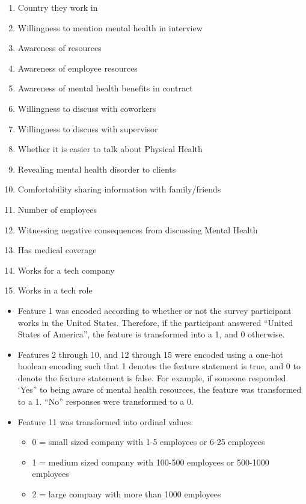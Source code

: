 \documentclass[times, twocolumn]{article}
\begin{document}
\begin{enumerate}
    \item Country they work in
    \item Willingness to mention mental health in interview
    \item Awareness of resources
    \item Awareness of employee resources
    \item Awareness of mental health benefits in contract
    \item Willingness to discuss with coworkers
    \item Willingness to discuss with supervisor
    \item Whether it is easier to talk about Physical Health
    \item Revealing mental health disorder to clients
    \item Comfortability sharing information with family/friends
    \item Number of employees
    \item Witnessing negative consequences from discussing Mental Health
    \item Has medical coverage
    \item Works for a tech company
    \item Works in a tech role
\end{enumerate}


\begin{itemize}
    \item Feature 1 was encoded according to whether or not the survey
    participant works in the United States. Therefore, if the participant
    answered “United States of America”, the feature is transformed into a
    1, and 0 otherwise.
    \item Features 2 through 10, and 12 through 15 were encoded using a one-hot
    boolean encoding such that 1 denotes the feature statement is true, and 0 to
    denote the feature statement is false. For example, if someone responded ‘Yes”
    to being aware of mental health resources, the feature was transformed to a 1.
    “No” responses were transformed to a 0.
    \item Feature 11 was transformed into ordinal values:
    \begin{itemize}
        \item 0 = small sized company with 1-5 employees or 6-25 employees
        \item 1 = medium sized company with 100-500 employees or 500-1000 employees
        \item 2 = large company with more than 1000 employees
    \end{itemize}
\end{itemize}
\end{document}
